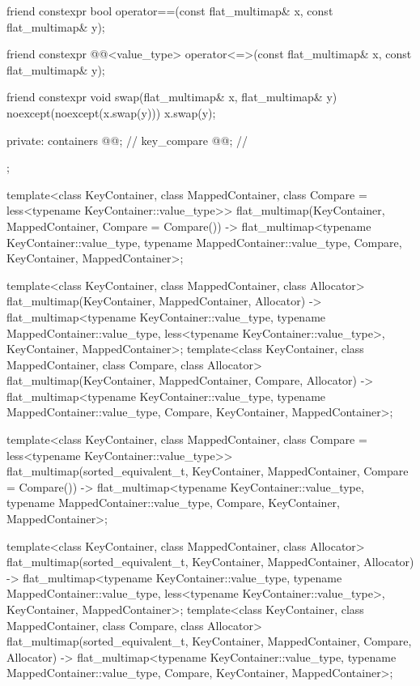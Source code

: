\begin{codeblock}
{{    friend constexpr bool operator==(const flat_multimap& x, const flat_multimap& y);

    friend constexpr @@<value_type>
      operator<=>(const flat_multimap& x, const flat_multimap& y);

    friend constexpr void swap(flat_multimap& x, flat_multimap& y)
      noexcept(noexcept(x.swap(y)))
      { x.swap(y); }

  private:
    containers @@;               // \expos
    key_compare @@;        // \expos
  };

  template<class KeyContainer, class MappedContainer,
           class Compare = less<typename KeyContainer::value_type>>
    flat_multimap(KeyContainer, MappedContainer, Compare = Compare())
      -> flat_multimap<typename KeyContainer::value_type, typename MappedContainer::value_type,
                       Compare, KeyContainer, MappedContainer>;

  template<class KeyContainer, class MappedContainer, class Allocator>
    flat_multimap(KeyContainer, MappedContainer, Allocator)
      -> flat_multimap<typename KeyContainer::value_type, typename MappedContainer::value_type,
                       less<typename KeyContainer::value_type>, KeyContainer, MappedContainer>;
  template<class KeyContainer, class MappedContainer, class Compare, class Allocator>
    flat_multimap(KeyContainer, MappedContainer, Compare, Allocator)
      -> flat_multimap<typename KeyContainer::value_type, typename MappedContainer::value_type,
                       Compare, KeyContainer, MappedContainer>;

  template<class KeyContainer, class MappedContainer,
           class Compare = less<typename KeyContainer::value_type>>
    flat_multimap(sorted_equivalent_t, KeyContainer, MappedContainer, Compare = Compare())
      -> flat_multimap<typename KeyContainer::value_type, typename MappedContainer::value_type,
                       Compare, KeyContainer, MappedContainer>;

  template<class KeyContainer, class MappedContainer, class Allocator>
    flat_multimap(sorted_equivalent_t, KeyContainer, MappedContainer, Allocator)
      -> flat_multimap<typename KeyContainer::value_type, typename MappedContainer::value_type,
                       less<typename KeyContainer::value_type>, KeyContainer, MappedContainer>;
  template<class KeyContainer, class MappedContainer, class Compare, class Allocator>
    flat_multimap(sorted_equivalent_t, KeyContainer, MappedContainer, Compare, Allocator)
      -> flat_multimap<typename KeyContainer::value_type, typename MappedContainer::value_type,
                       Compare, KeyContainer, MappedContainer>;

}
\end{codeblock}
